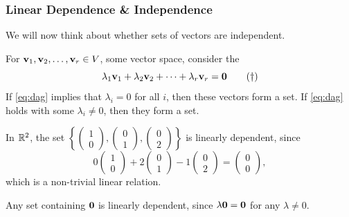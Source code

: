 \documentclass[a4paper]{scrartcl}
\begin{document}
\subsubsection{Linear Dependence \& Independence}

We will now think about whether sets of vectors are independent. 

\begin{definition}
    For $\mathbf{v}_1, \mathbf{v}_2, \dots, \mathbf{v}_r \in V$, some vector space, consider the 
    \begin{equation}\label{eq:dag}
        \lambda_1 \mathbf{v}_1 + \lambda_2 \mathbf{v}_2 + \cdots + \lambda_r \mathbf{v}_r = \mathbf{0} \tag{$\dagger$}
    \end{equation}
    If \eqref{eq:dag} implies that $\lambda_i = 0$ for all $i$, then these vectors form a  set. If \eqref{eq:dag} holds with some $\lambda_i \neq 0$, then they form a  set.
\end{definition}


\begin{example}
    In $\mathbb{R}^2$, the set $\left\{\begin{pmatrix}1 \\ 0\end{pmatrix}, \begin{pmatrix}0 \\ 1\end{pmatrix}, \begin{pmatrix}0 \\ 2\end{pmatrix}\right\}$ is linearly dependent, since
    $$
    0\begin{pmatrix}1 \\ 0\end{pmatrix} + 2\begin{pmatrix}0 \\ 1\end{pmatrix} - 1\begin{pmatrix}0 \\ 2\end{pmatrix} = \begin{pmatrix}0 \\ 0\end{pmatrix},
    $$
    which is a non-trivial linear relation.
\end{example}

Any set containing $\mathbf{0}$ is linearly dependent, since $\lambda \mathbf{0} = \mathbf{0}$ for any $\lambda \neq 0$.
\end{document}
